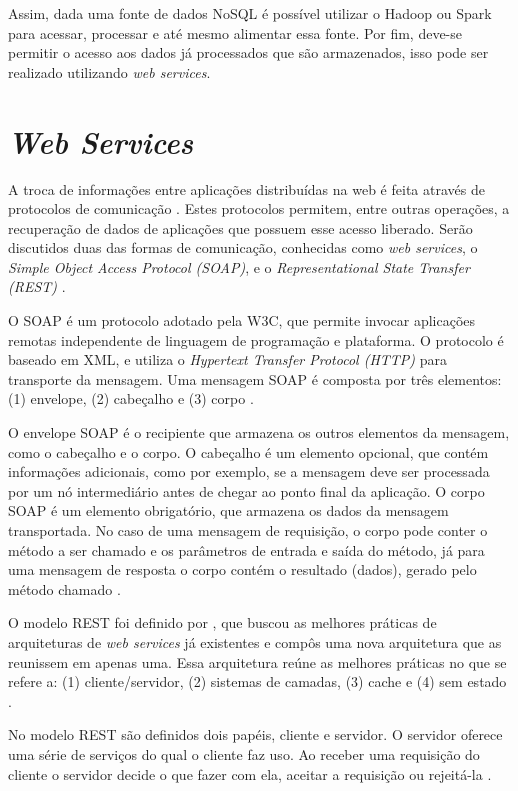 Assim, dada uma fonte de dados NoSQL é possível utilizar o Hadoop ou Spark para acessar,
processar e até mesmo alimentar essa fonte. Por fim, deve-se permitir o acesso aos dados
já processados que são armazenados, isso pode ser realizado utilizando \textit{web services}. 


\section{\textit{Web Services}}
\label{sec:api}

A troca de informações entre aplicações distribuídas na web é feita através de protocolos de 
comunicação \cite{schepke2010avaliaccao}. Estes protocolos permitem, entre outras operações, a 
recuperação de dados de aplicações que possuem esse acesso liberado. Serão discutidos duas 
das formas de comunicação, conhecidas como \textit{web services}, o 
\textit{Simple Object Access Protocol (SOAP)}, e o \textit{Representational State Transfer (REST)} \cite{lima2012}.

O SOAP é um protocolo adotado pela W3C, que permite invocar aplicações remotas independente de 
linguagem de programação e plataforma. O protocolo é baseado em XML, e utiliza o 
\textit{Hypertext Transfer Protocol (HTTP)} para transporte da mensagem. Uma mensagem SOAP é 
composta por três elementos: (1) envelope, (2) cabeçalho e (3) corpo \cite{suda2003soap}.

O envelope SOAP é o recipiente que armazena os outros elementos da mensagem, como o cabeçalho 
e o corpo.  O cabeçalho é um elemento opcional, que contém informações adicionais, como por 
exemplo, se a mensagem deve ser processada por um nó intermediário antes de chegar ao ponto 
final da aplicação. O corpo SOAP é um elemento obrigatório, que armazena os dados da mensagem 
transportada. No caso de uma mensagem de requisição, o corpo pode conter o método a ser 
chamado e os parâmetros de entrada e saída do método, já para uma mensagem de resposta o 
corpo contém o resultado (dados), gerado pelo método chamado \cite{suda2003soap}.

O modelo REST foi definido por , que buscou as melhores 
práticas de arquiteturas de \textit{web services} já existentes e compôs uma nova arquitetura 
que as reunissem em apenas uma. Essa arquitetura reúne as melhores práticas no que se refere 
a: (1) cliente/servidor, (2) sistemas de camadas, (3) cache e (4) sem estado 
\cite{fielding2000architectural}.

No modelo REST são definidos dois papéis, cliente e servidor. O servidor oferece uma série 
de serviços do qual o cliente faz uso. Ao receber uma requisição do cliente o servidor decide 
o que fazer com ela, aceitar a requisição ou rejeitá-la \cite{fielding2000architectural}.

